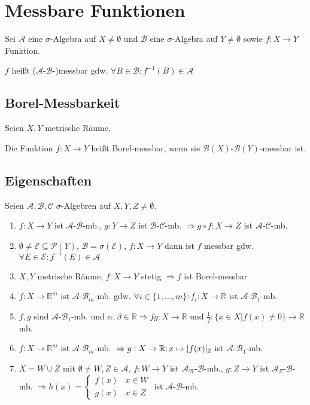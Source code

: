 \section*{Messbare Funktionen}

Sei $\mathcal{A}$ eine $\sigma$-Algebra auf $X\neq \emptyset$ und $\mathcal{B}$ eine $\sigma$-Algebra auf $Y\neq \emptyset$ sowie $f : X \rightarrow Y$ Funktion.

$f$ heißt ($\mathcal{A}$-$\mathcal{B}$-)messbar gdw. $\forall B \in \mathcal{B} : f^{-1}(B) \in \mathcal{A}$

\subsection*{Borel-Messbarkeit}

Seien $X, Y$ metrische Räume.

Die Funktion $f : X \rightarrow Y$ heißt Borel-messbar, wenn sie $\mathcal{B}(X)$-$\mathcal{B}(Y)$-messbar ist.

\subsection*{Eigenschaften}

Seien $\mathcal{A}, \mathcal{B}, \mathcal{C}$ $\sigma$-Algebren auf $X, Y, Z \neq \emptyset$.

\begin{enumerate}[label=(\alph*)]
	\item $f : X \rightarrow Y$ ist $\mathcal{A}$-$\mathcal{B}$-mb., $g : Y \rightarrow Z$ ist $\mathcal{B}$-$\mathcal{C}$-mb. $\Rightarrow g \circ f : X \rightarrow Z$ ist $\mathcal{A}$-$\mathcal{C}$-mb.
	\item $\emptyset \neq \mathcal{E} \subseteq \mathcal{P}(Y)$, $\mathcal{B} = \sigma(\mathcal{E})$, $f: X \rightarrow Y$ dann ist $f$ messbar gdw. $\forall E \in \mathcal{E} : f^{-1}(E) \in \mathcal{A}$
	\item $X, Y$ metrische Räume, $f : X \rightarrow Y$ stetig $\Rightarrow f$ ist Borel-messbar
	\item $f : X \rightarrow \mathbb{R}^m$ ist $\mathcal{A}$-$\mathcal{B}_m$-mb. gdw. $\forall i \in \{1, \dots, m\} : f_i : X \rightarrow \mathbb{R}$ ist $\mathcal{A}$-$\mathcal{B}_1$-mb.
	\item $f, g$ sind $\mathcal{A}$-$\mathcal{B}_1$-mb. und $\alpha, \beta \in \mathbb{R} \Rightarrow fg : X \rightarrow \mathbb{R}$ und $\frac{1}{f} : \{x \in X | f(x) \neq 0\} \rightarrow \mathbb{R}$ mb.
	\item $f : X \rightarrow \mathbb{R}^m$ ist $\mathcal{A}$-$\mathcal{B}_m$-mb. $\\\Rightarrow g : X \rightarrow \mathbb{R}; x \mapsto |f(x)|_2$ ist $\mathcal{A}$-$\mathcal{B}_1$-mb.
	\item $X = W \dot\cup Z$ mit $\emptyset \neq W, Z \in \mathcal{A}$, $f : W \rightarrow Y$ ist $\mathcal{A}_W$-$\mathcal{B}$-mb., $g : Z \rightarrow Y$ ist $\mathcal{A}_Z$-$\mathcal{B}$-mb. $\Rightarrow h(x) = \begin{cases}
	f(x) & x \in W \\
	g(x) & x \in Z
\end{cases}$ ist $\mathcal{A}$-$\mathcal{B}$-mb.
\end{enumerate}
